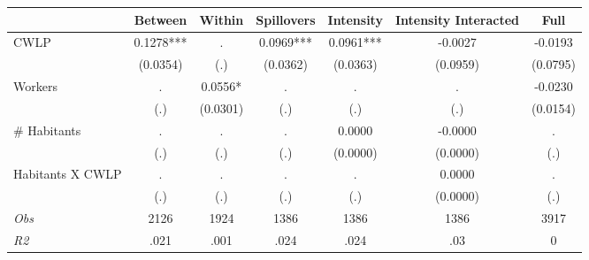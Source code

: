 \begin{tabular}{l*{6}{c}}\hline&\multicolumn{1}{c}{Between}&\multicolumn{1}{c}{Within}&\multicolumn{1}{c}{Spillovers}&\multicolumn{1}{c}{Intensity}&\multicolumn{1}{c}{Intensity Interacted}&\multicolumn{1}{c}{Full}\\ \hline 
CWLP & 0.1278*** & . & 0.0969*** & 0.0961*** & -0.0027 & -0.0193 \\
 & (0.0354) & (.) & (0.0362) & (0.0363) & (0.0959) & (0.0795) \\
Workers & . & 0.0556* & . & . & . & -0.0230 \\
 & (.) & (0.0301) & (.) & (.) & (.) & (0.0154) \\
\# Habitants & . & . & . & 0.0000 & -0.0000 & . \\
 & (.) & (.) & (.) & (0.0000) & (0.0000) & (.) \\
Habitants X CWLP & . & . & . & . & 0.0000 & . \\
 & (.) & (.) & (.) & (.) & (0.0000) & (.) \\
\hline \textit{Obs} & 2126 & 1924 & 1386 & 1386 & 1386 & 3917 \\ \textit{R2} & .021 & .001 & .024 & .024 & .03 & 0 \\ \hline \end{tabular}

